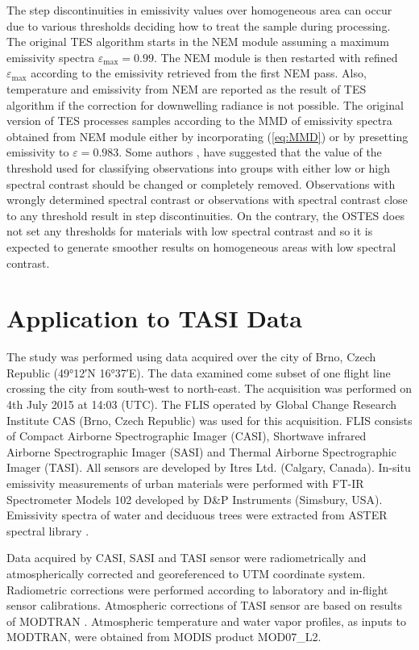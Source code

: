The step discontinuities in emissivity values over homogeneous area can occur due to various thresholds deciding how to treat the sample during processing. The original TES algorithm starts in the NEM module assuming a maximum emissivity spectra $\varepsilon_\mathrm{max}=0.99$. The NEM module is then restarted with refined $\varepsilon_\mathrm{max}$ according to the emissivity retrieved from the first NEM pass. Also,	 temperature and emissivity from NEM are reported as the result of TES algorithm if the correction for downwelling radiance is not possible. The original version of TES processes samples according to the MMD of emissivity spectra obtained from NEM module either by incorporating (\ref{eq:MMD}) or by presetting emissivity to $\varepsilon = 0.983$. Some authors \cite{GG06}, \cite{SG09} have suggested that the value of the threshold used for classifying observations into groups with either low or high spectral contrast should be changed or completely removed. Observations with wrongly determined spectral contrast or observations with spectral contrast close to any threshold result in step discontinuities. On the contrary, the OSTES does not set any thresholds for materials with low spectral contrast and so it is expected to generate smoother results on homogeneous areas with low spectral contrast.

\section{Application to TASI Data}

The study was performed using data acquired over the city of Brno, Czech Republic (49°12′N 16°37′E). The data examined come subset of one flight line crossing the city from south-west to north-east. The acquisition was performed on 4th July 2015 at 14:03 (UTC). The FLIS operated by Global Change Research Institute CAS (Brno, Czech Republic) \cite{HF14} was used for this acquisition. FLIS consists of Compact Airborne Spectrographic Imager (CASI), Shortwave infrared Airborne Spectrographic Imager (SASI) and Thermal Airborne Spectrographic Imager (TASI). All sensors are developed by Itres Ltd. (Calgary, Canada). In-situ emissivity measurements of urban materials were performed with FT-IR Spectrometer Models 102 developed by D\&P Instruments (Simsbury, USA). Emissivity spectra of water and deciduous trees were extracted from ASTER spectral library \cite{BH09}.

Data acquired by CASI, SASI and TASI sensor were radiometrically and atmospherically corrected and georeferenced to UTM coordinate system. Radiometric corrections were performed according to laboratory and in-flight sensor calibrations. Atmospheric corrections of TASI sensor are based on results of MODTRAN \cite{BG06}. Atmospheric temperature and water vapor profiles, as inputs to MODTRAN, were obtained from MODIS product MOD07\_L2.

